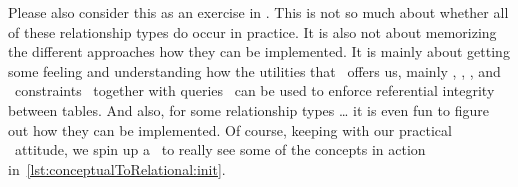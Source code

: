 Please also consider this as an exercise in \sql.
This is not so much about whether all of these relationship types do occur in practice.
It is also not about memorizing the different approaches how they can be implemented.
It is mainly about getting some feeling and understanding how the utilities that \sql\ offers us, mainly , , , and ~constraints~\cite{PGDG:PD:C} together with  queries~\cite{PGDG:PD:JT} can be used to enforce referential integrity between tables.
And also, for some relationship types {\dots} it is even fun to figure out how they can be implemented.%
%
%
%
Of course, keeping with our practical ~attitude, we spin up a \db\ to really see some of the concepts in action in~\cref{lst:conceptualToRelational:init}.%
%
%
%
%
\FloatBarrier%
